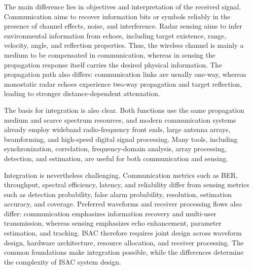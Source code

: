 The main difference lies in objectives and interpretation of the received
signal.
Communication aims to recover information bits or symbols reliably in the
presence of channel effects, noise, and interference.
Radar sensing aims to infer environmental information from echoes, including
target existence, range, velocity, angle, and reflection properties.
Thus, the wireless channel is mainly a medium to be compensated in
communication, whereas in sensing the propagation response itself carries the
desired physical information.
The propagation path also differs: communication links are usually one-way,
whereas monostatic radar echoes experience two-way propagation and target
reflection, leading to stronger distance-dependent attenuation.

The basis for integration is also clear.
Both functions use the same propagation medium and scarce spectrum resources,
and modern communication systems already employ wideband radio-frequency
front ends, large antenna arrays, beamforming, and high-speed digital signal
processing.
Many tools, including synchronization, correlation, frequency-domain analysis,
array processing, detection, and estimation, are useful for both communication
and sensing.

Integration is nevertheless challenging.
Communication metrics such as BER, throughput, spectral efficiency, latency,
and reliability differ from sensing metrics such as detection probability,
false alarm probability, resolution, estimation accuracy, and coverage.
Preferred waveforms and receiver processing flows also differ: communication
emphasizes information recovery and multi-user transmission, whereas sensing
emphasizes echo enhancement, parameter estimation, and tracking.
ISAC therefore requires joint design across waveform design, hardware
architecture, resource allocation, and receiver processing.
The common foundations make integration possible, while the differences
determine the complexity of ISAC system design.